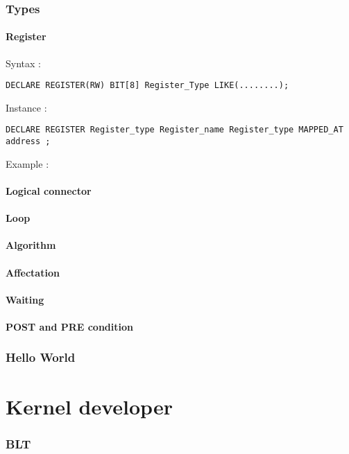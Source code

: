 \documentclass{rtxreport}
\begin{document}
\subsection{Types}

\subsubsection{Register}
Syntax :
\begin{lstlisting}
DECLARE REGISTER(RW) BIT[8] Register_Type LIKE(........);
\end{lstlisting}

Instance :
\begin{lstlisting}
DECLARE REGISTER Register_type Register_name Register_type MAPPED_AT
address ;
\end{lstlisting}

Example :

\subsubsection{Logical connector}

\subsubsection{Loop}

\subsubsection{Algorithm}

\subsubsection{Affectation}
\subsubsection{Waiting}
\subsubsection{POST and PRE condition}

\subsection{Hello World}

\chapter{Kernel developer}
\subsection {BLT}

\rtxbibliography
\end{document}
